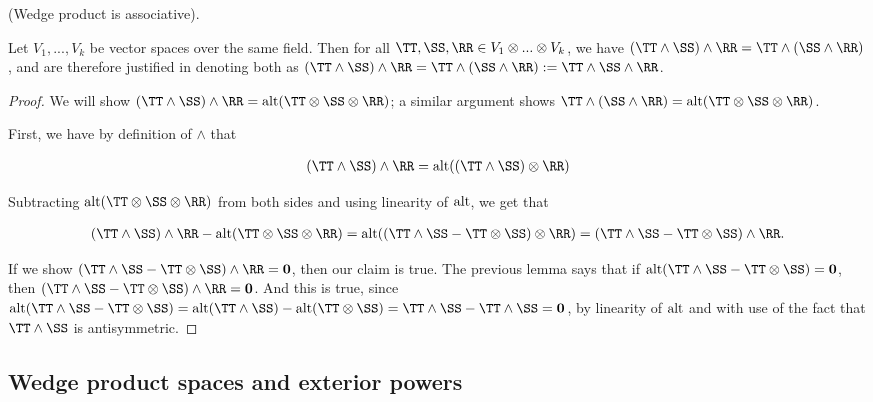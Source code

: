 \begin{theorem}
\label{ch::exterior_pwrs::thm::wedge_associativity}
    (Wedge product is associative). 
    
    Let $V_1, ..., V_k$ be vector spaces over the same field. Then for all $\TT, \SS, \RR \in V_1 \otimes ... \otimes V_k$, we have $(\TT \wedge \SS) \wedge \RR = \TT \wedge (\SS \wedge \RR)$, and are therefore justified in denoting both as $(\TT \wedge \SS) \wedge \RR = \TT \wedge (\SS \wedge \RR) := \TT \wedge \SS \wedge \RR$.
\end{theorem}

\begin{proof}
    We will show $(\TT \wedge \SS) \wedge \RR = \alt(\TT \otimes \SS \otimes \RR)$; a similar argument shows $\TT \wedge (\SS \wedge \RR) = \alt(\TT \otimes \SS \otimes \RR)$.
    
    First, we have by definition of $\wedge$ that 
    
    \begin{align*}
        (\TT \wedge \SS) \wedge \RR = \alt((\TT \wedge \SS) \otimes \RR)
    \end{align*}
    
    Subtracting $\alt(\TT \otimes \SS \otimes \RR)$ from both sides and using linearity of $\text{alt}$, we get that
    
    \begin{align*}
        (\TT \wedge \SS) \wedge \RR - \alt(\TT \otimes \SS \otimes \RR) = \alt((\TT \wedge \SS - \TT \otimes \SS) \otimes \RR) = (\TT \wedge \SS - \TT \otimes \SS) \wedge \RR.
    \end{align*}
    
    If we show $(\TT \wedge \SS - \TT \otimes \SS) \wedge \RR = \mathbf{0}$, then our claim is true. The previous lemma says that if $\alt(\TT \wedge \SS - \TT \otimes \SS) = \mathbf{0}$, then  $(\TT \wedge \SS - \TT \otimes \SS) \wedge \RR = \mathbf{0}$. And this is true, since $\alt(\TT \wedge \SS - \TT \otimes \SS) = \alt(\TT \wedge \SS) - \alt(\TT \otimes \SS) = \TT \wedge \SS - \TT \wedge \SS = \mathbf{0}$, by linearity of $\text{alt}$ and with use of the fact that $\TT \wedge \SS$ is antisymmetric.
\end{proof}

\subsection*{Wedge product spaces and exterior powers}

